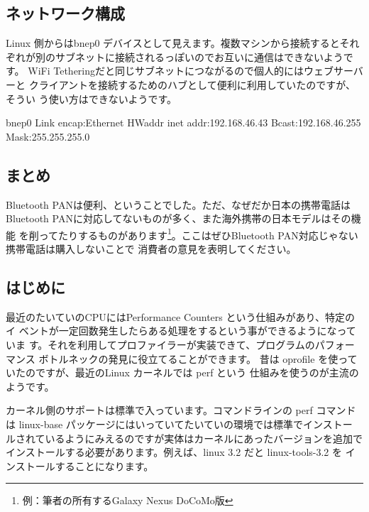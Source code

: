 \documentclass[mingoth,a4paper]{jsarticle}
\begin{document}
\subsection{ネットワーク構成}

Linux 側からはbnep0 デバイスとして見えます。複数マシンから接続するとそれ
ぞれが別のサブネットに接続されるっぽいのでお互いに通信はできないようです。
WiFi Tetheringだと同じサブネットにつながるので個人的にはウェブサーバーと
クライアントを接続するためのハブとして便利に利用していたのですが、そうい
う使い方はできないようです。

\begin{commandline}
bnep0     Link encap:Ethernet  HWaddr 
          inet addr:192.168.46.43  Bcast:192.168.46.255  Mask:255.255.255.0
\end{commandline}

\subsection{まとめ}

Bluetooth PANは便利、ということでした。ただ、なぜだか日本の携帯電話は
Bluetooth PANに対応してないものが多く、また海外携帯の日本モデルはその機能
を削ってたりするものがあります\footnote{例：筆者の所有するGalaxy Nexus
DoCoMo版}。ここはぜひBluetooth PAN対応じゃない携帯電話は購入しないことで
消費者の意見を表明してください。


\subsection{はじめに}

最近のたいていのCPUにはPerformance Counters という仕組みがあり、特定のイ
ベントが一定回数発生したらある処理をするという事ができるようになっていま
す。それを利用してプロファイラーが実装できて、プログラムのパフォーマンス
ボトルネックの発見に役立てることができます。
昔は oprofile を使っていたのですが、最近のLinux カーネルでは perf という
仕組みを使うのが主流のようです。

カーネル側のサポートは標準で入っています。コマンドラインの perf コマンド
は linux-base パッケージにはいっていてたいていの環境では標準でインストー
ルされているようにみえるのですが実体はカーネルにあったバージョンを追加で
インストールする必要があります。例えば、linux 3.2 だと linux-tools-3.2 を
インストールすることになります。
\end{document}
